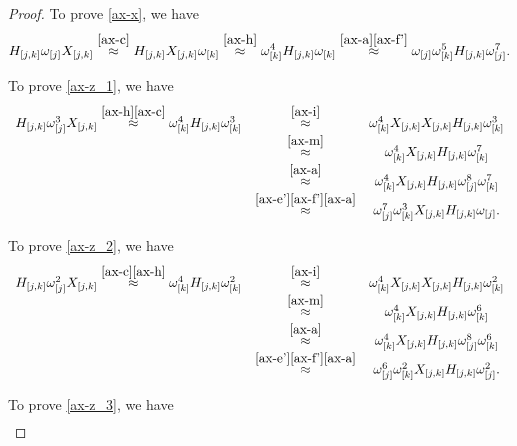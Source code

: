 \documentclass{dalthesis}
\theoremstyle{theorem}
\theoremstyle{definition}
\theoremstyle{definition}  %
\theoremstyle{definition}
\newcommand{\jay}{j}
\newcommand{\kay}{k}
\renewcommand{\:}{\mathbin{:}}
\begin{document}
\begin{proof}
  To prove \eqref{ax-x}, we have \[H_{[\jay,\kay]}\omega_{[\jay]}X_{[\jay,\kay]}\stackrel{\eqref{ax-c}}{\approx}H_{[\jay,\kay]}X_{[\jay,\kay]}\omega_{[\kay]}\stackrel{\eqref{ax-h}}{\approx}\omega^4_{[\kay]}H_{[\jay,\kay]}\omega_{[\kay]}\stackrel{\eqref{ax-a}\eqref{ax-f'}}{\approx}\omega_{[\jay]}\omega^5_{[\kay]}H_{[\jay,\kay]}\omega^7_{[\jay]}.\]
  
  To prove \eqref{ax-z_1}, we have \[
\begin{array}{ccc}
  H_{[\jay,\kay]}\omega^3_{[\jay]}
  X_{[\jay,\kay]}\stackrel{\eqref{ax-h}
  \eqref{ax-c}}{\approx}\omega^4_{[k]}
  H_{[\jay,\kay]}\omega^3_{[\kay]}
  &\stackrel{\eqref{ax-i}}{\approx}&\omega^4_{[k]}X_{[\jay,\kay]}X_{[\jay,\kay]}
  H_{[\jay,\kay]}\omega^3_{[\kay]}\\
  &\stackrel{\eqref{ax-m}}
  {\approx}&\omega^4_{[\kay]}X_{[\jay,\kay]}
  H_{[\jay,\kay]}\omega^7_{[\kay]}\\
  &\stackrel{\eqref{ax-a}}{\approx}&\omega^4_{[\kay]}X_{[\jay,\kay]}
  H_{[\jay,\kay]}\omega^8_{[\jay]}\omega^7_{[\kay]}\\&\stackrel{\eqref{ax-e'}\eqref{ax-f'}\eqref{ax-a}}{\approx}&
  \omega^7_{[\jay]}\omega^3_{[\kay]}
  X_{[\jay,\kay]}H_{[\jay,\kay]}
  \omega_{[\jay]}.\\  
  \end{array}  
\]
  
  To prove \eqref{ax-z_2}, we have \[
\begin{array}{ccc}
  
  H_{[\jay,\kay]}\omega^2_{[\jay]}X_{[\jay,\kay]}\stackrel{\eqref{ax-c}\eqref{ax-h}}{\approx}\omega^4_{[\kay]}H_{[\jay,\kay]}\omega^2_{[\kay]}&\stackrel{\eqref{ax-i}}{\approx}&\omega^4_{[\kay]}X_{[\jay,\kay]}X_{[\jay,\kay]}H_{[\jay,\kay]}\omega^2_{[\kay]}\\&\stackrel{\eqref{ax-m}}{\approx}&\omega^4_{[\kay]}X_{[\jay,\kay]}H_{[\jay,\kay]}\omega^6_{[\kay]}\\
  &\stackrel{\eqref{ax-a}}{\approx}&\omega^4_{[\kay]}X_{[\jay,\kay]}H_{[\jay,\kay]}\omega^8_{[\jay]}\omega^6_{[\kay]}\\&\stackrel{\eqref{ax-e'}\eqref{ax-f'}\eqref{ax-a}}{\approx}&\omega^6_{[\jay]}\omega^2_{[\kay]}X_{[\jay,\kay]}H_{[\jay,\kay]}\omega^2_{[\jay]}.\\
\end{array}  
\]
  
To prove \eqref{ax-z_3}, we have \[
\begin{array}{ccc}


\end{array}\]
\end{proof}
\end{document}
